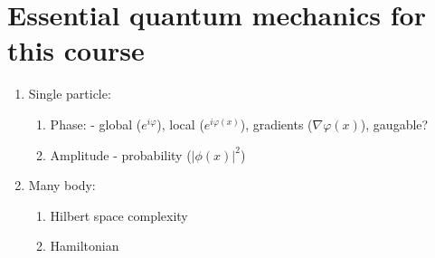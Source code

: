 \section{Essential quantum mechanics for this course}

\begin{enumerate}
	\item Single particle:
		\begin{enumerate}
			\item Phase: - global ($e^{i\varphi}$), local ($e^{i\varphi(x)}$), gradients ($\nabla \varphi(x)$), gaugable?
			\item Amplitude - probability ($|\phi(x)|^2$)
		\end{enumerate}
	\item Many body:
		\begin{enumerate}
			\item Hilbert space complexity
			\item Hamiltonian
		\end{enumerate}
\end{enumerate}

